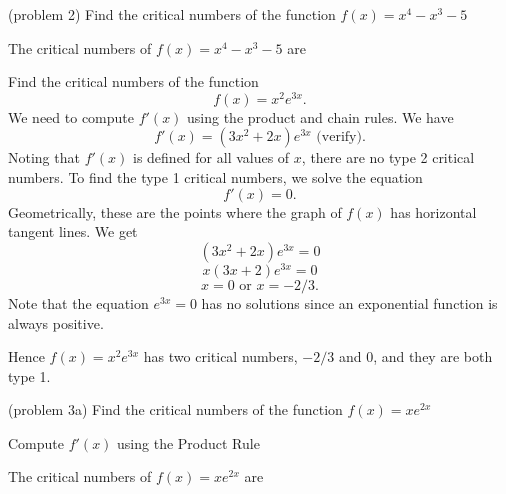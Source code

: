 \documentclass{ximera}
\begin{document}
\begin{problem}(problem 2)
  Find the critical numbers of the function $f(x) = x^4 - x^3 - 5$
    
		The critical numbers of $f(x) = x^4 - x^3 - 5$ are
		\begin{multipleChoice}
		\end{multipleChoice} 
		
\end{problem}




\begin{example}[example 3] Find the critical numbers of the function 
\[f(x) = x^2e^{3x}.\]
We need to compute $f'(x)$ using the product and chain rules.  We have
\[f'(x) = (3x^2 +2x)e^{3x} \mbox{   (verify)}.\]
Noting that $f'(x)$ is defined for all values of $x$, there are no type 2 critical numbers.
To find the type 1 critical numbers, we solve the equation
\[f'(x) = 0.\]
Geometrically, these are the points where the graph of $f(x)$ has horizontal tangent lines.
We get
\[ (3x^2 +2x)e^{3x} =0\]
\[ x(3x+2)e^{3x} =0\]
\[x = 0 \mbox{   or   }  x = -2/3.\]
Note that the equation $e^{3x} = 0$ has no solutions since an exponential function is always positive.

Hence $f(x) = x^2e^{3x}$ has two critical numbers, $-2/3$ and $0$, and they are both type 1. 

\begin{image}
\end{image}

\end{example}

\begin{problem}(problem 3a)
  Find the critical numbers of the function $f(x) = xe^{2x}$
  
  
    \begin{hint}
      Compute $f'(x)$ using the Product Rule
    \end{hint}    
    
		The critical numbers of $f(x) = xe^{2x}$ are
		\begin{multipleChoice}
		\choice[correct]{$x = -1/2$}
		\choice{$x = 0$ and $x = -1/2$}
		\choice{no critical numbers}
		\end{multipleChoice} 
		
\end{problem}
\end{document}
